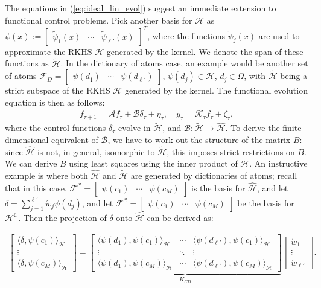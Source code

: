 \documentclass[letterpaper,12pt,peerreviewca,draftcls]{IEEEtran}
\def\l{\langle}
\def\r{\rangle}
\newcommand{\weight}{w}
\newcommand{\fspace}{\mathcal{H}}
\newcommand{\fmap}{\psi}
\newcommand{\sysop}{\mathcal{A}}
\newcommand{\controlop}{\mathcal{B}}
\newcommand{\measop}{\mathcal{K}}
\newcommand{\centers}{C}
\newcommand{\centerscontrol}{D}
\newcommand{\control}{\delta}
\newcommand{\empK}{\ensuremath{K}}
\newcommand{\dom}{\Omega}
\newcommand{\ncent}{M}
\newcommand{\shCent}{\mathcal{C}}
\newcommand{\eqlabel}[1]{\label{eq:#1}}
\renewcommand{\eqref}[1]{(\ref{eq:#1})}
\def\l{\langle}
\def\r{\rangle}
\newcommand{\fspaceC}{\ensuremath{\mathcal{H}^{\mathcal{C}}}}
\newcommand{\fspaceD}{\ensuremath{\widetilde{\fspace}}}
\newcommand{\AtomsControl}{\mathcal{F}_{\centerscontrol}}
\newcommand{\fspaceApprox}{\widehat{\fspace}}
\newcommand{\Kiprod}[2]{\langle \fmap(#1),\fmap(#2) \rangle_{\fspace}}
\newcommand{\Atoms}{\mathcal{F}^{\shCent}}
\newcommand{\ncontrol}{\ell'}
\newcommand{\weightc}{\acute{\weight}}
\newcommand{\empKCD}{\empK_{\centers\centerscontrol}}
\newcommand{\cbasis}{\widetilde{\psi}}
\newcommand{\tindex}{\tau}
\begin{document}
The equations in \eqref{ideal_lin_evol} suggest an immediate extension to functional control problems. 
Pick another basis for $\fspace$ as $\cbasis(x) := \begin{bmatrix}\cbasis_1(x) &\cdots & \cbasis_{\ncontrol}(x)
\end{bmatrix}^T$, where the functions $\cbasis_j(x)$ are used to approximate the RKHS $\fspace$ generated by the kernel. We denote the span of these functions as $\fspaceD$. In the dictionary of atoms case, an example would be another set of atoms
 $\AtomsControl = \begin{bmatrix}\fmap(d_1) &\cdots & \fmap(d_{\ncontrol})
\end{bmatrix}$, $\fmap(d_j)\in\fspace$, $d_j\in\dom$, with $\fspaceD$ being a strict subspace of the RKHS $\fspace$  generated by the kernel. 
The functional evolution equation is then as follows:
\begin{align}\eqlabel{ideal_lin_evol_control}
 f_{\tindex+1} = \sysop f_{\tindex} + \controlop \control_{\tindex} + \eta_{\tindex}, \quad y_{\tindex} = \measop_{\tindex} f_{\tindex} + \zeta_{\tindex},
\end{align}
where the control functions $\control_{\tindex}$ evolve in $\fspaceD$, and $\controlop:\fspaceD\to\fspaceApprox$. To derive the finite-dimensional equivalent of $\controlop$, we have to work out the structure of the matrix $B$: since $\fspaceApprox$ is not, in general, isomorphic to $\fspaceD$, this imposes strict restrictions on $B$. We can derive $B$ using least squares using the inner product of $\fspace$. An instructive example is where both $\fspaceApprox$ and $\fspaceD$ are generated by dictionaries of atoms; recall that in this case, $\Atoms = 
 \begin{bmatrix}\fmap(c_1) &\cdots & \fmap(c_{\ncent})
\end{bmatrix}$ is the basis for $\fspaceApprox$, and let $\control = \sum_{j=1}^{\ncontrol}\weightc_j\fmap(d_j)$, and let $\Atoms = 
 \begin{bmatrix}\fmap(c_1) &\cdots & \fmap(c_{\ncent})
\end{bmatrix}$ be the basis for $\fspaceC$. Then the projection of $\delta$ onto $\fspaceApprox$ can be derived as: 


\begin{align}
 \begin{bmatrix}
  \l \delta, \fmap(c_1) \r_{\fspace}\\
   \vdots\\
  \l \delta, \fmap(c_{\ncent}) \r_{\fspace} 
 \end{bmatrix}
 = 
 \underbrace{
 \begin{bmatrix}
  \Kiprod{d_1}{c_1} & \cdots & \Kiprod{d_{\ncontrol}}{c_1}\\
   \vdots  &\ddots &\vdots\\
  \Kiprod{d_1}{c_{\ncent}} & \cdots & \Kiprod{d_{\ncontrol}}{c_{\ncent}}
 \end{bmatrix}}_{\empKCD}
  \begin{bmatrix}
   \weightc_1\\
   \vdots\\
   \weightc_{\ncontrol}
  \end{bmatrix}.
\end{align}
\end{document}
